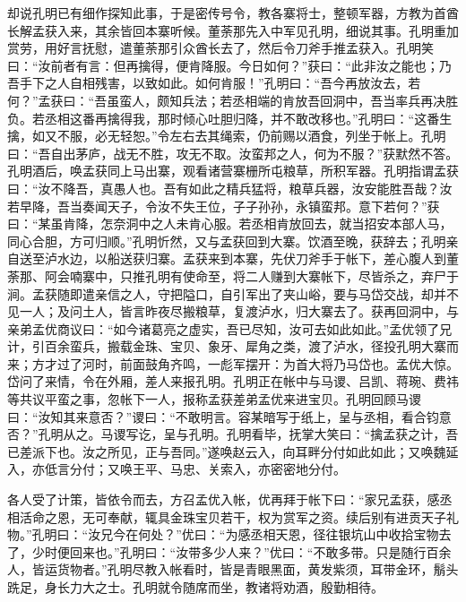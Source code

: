 却说孔明已有细作探知此事，于是密传号令，教各寨将士，整顿军器，方教为首酋长解孟获入来，其余皆回本寨听候。董荼那先入中军见孔明，细说其事。孔明重加赏劳，用好言抚慰，遣董荼那引众酋长去了，然后令刀斧手推孟获入。孔明笑曰：“汝前者有言：但再擒得，便肯降服。今日如何？”获曰：“此非汝之能也；乃吾手下之人自相残害，以致如此。如何肯服！”孔明曰：“吾今再放汝去，若何？”孟获曰：“吾虽蛮人，颇知兵法；若丞相端的肯放吾回洞中，吾当率兵再决胜负。若丞相这番再擒得我，那时倾心吐胆归降，并不敢改移也。”孔明曰：“这番生擒，如又不服，必无轻恕。”令左右去其绳索，仍前赐以酒食，列坐于帐上。孔明曰：“吾自出茅庐，战无不胜，攻无不取。汝蛮邦之人，何为不服？”获默然不答。孔明酒后，唤孟获同上马出寨，观看诸营寨栅所屯粮草，所积军器。孔明指谓孟获曰：“汝不降吾，真愚人也。吾有如此之精兵猛将，粮草兵器，汝安能胜吾哉？汝若早降，吾当奏闻天子，令汝不失王位，子子孙孙，永镇蛮邦。意下若何？”获曰：“某虽肯降，怎奈洞中之人未肯心服。若丞相肯放回去，就当招安本部人马，同心合胆，方可归顺。”孔明忻然，又与孟获回到大寨。饮酒至晚，获辞去；孔明亲自送至泸水边，以船送获归寨。孟获来到本寨，先伏刀斧手于帐下，差心腹人到董荼那、阿会喃寨中，只推孔明有使命至，将二人赚到大寨帐下，尽皆杀之，弃尸于涧。孟获随即遣亲信之人，守把隘口，自引军出了夹山峪，要与马岱交战，却并不见一人；及问土人，皆言昨夜尽搬粮草，复渡泸水，归大寨去了。获再回洞中，与亲弟孟优商议曰：“如今诸葛亮之虚实，吾已尽知，汝可去如此如此。”孟优领了兄计，引百余蛮兵，搬载金珠、宝贝、象牙、犀角之类，渡了泸水，径投孔明大寨而来；方才过了河时，前面鼓角齐鸣，一彪军摆开：为首大将乃马岱也。孟优大惊。岱问了来情，令在外厢，差人来报孔明。孔明正在帐中与马谡、吕凯、蒋琬、费祎等共议平蛮之事，忽帐下一人，报称孟获差弟孟优来进宝贝。孔明回顾马谡曰：“汝知其来意否？”谡曰：“不敢明言。容某暗写于纸上，呈与丞相，看合钧意否？”孔明从之。马谡写讫，呈与孔明。孔明看毕，抚掌大笑曰：“擒孟获之计，吾已差派下也。汝之所见，正与吾同。”遂唤赵云入，向耳畔分付如此如此；又唤魏延入，亦低言分付；又唤王平、马忠、关索入，亦密密地分付。

各人受了计策，皆依令而去，方召孟优入帐，优再拜于帐下曰：“家兄孟获，感丞相活命之恩，无可奉献，辄具金珠宝贝若干，权为赏军之资。续后别有进贡天子礼物。”孔明曰：“汝兄今在何处？”优曰：“为感丞相天恩，径往银坑山中收拾宝物去了，少时便回来也。”孔明曰：“汝带多少人来？”优曰：“不敢多带。只是随行百余人，皆运货物者。”孔明尽教入帐看时，皆是青眼黑面，黄发紫须，耳带金环，鬅头跣足，身长力大之士。孔明就令随席而坐，教诸将劝酒，殷勤相待。

